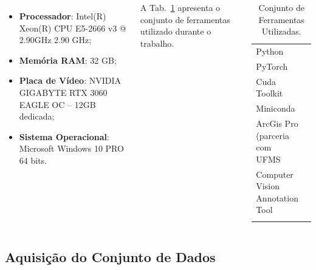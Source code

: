 \documentclass[%
  10pt,%
  aspectratio = 169,%
  compress,%
  t,%
  english,%
  brazilian,%
  tikz,
]{beamer}
\begin{document}
\begin{frame}
\begin{columns}[T]
\begin{itemize}
    \item \textbf{Processador}: Intel(R) Xeon(R) CPU E5-2666 v3 @ 2.90GHz 2.90 GHz;
    \item \textbf{Memória RAM}: 32 GB;
    \item \textbf{Placa de Vídeo}: NVIDIA GIGABYTE RTX 3060 EAGLE OC – 12GB dedicada;
    \item \textbf{Sistema Operacional}: Microsoft Windows 10 PRO 64 bits.
\end{itemize}

A Tab.~\ref{tab:tools} apresenta o conjunto de ferramentas utilizado durante o trabalho.
\begin{table}[!htb]
\centering%
\caption{Conjunto de Ferramentas Utilizadas.}%
\label{tab:tools}
\begin{tabular*}{\columnwidth}{@{\extracolsep{\fill}}ll}
\toprule
Python                                  & \cite{PythonManual}           \\
PyTorch                                 & \cite{pytorch}                \\
Cuda Toolkit                            & \cite{NvidiaCuda}                \\
Miniconda                               & \cite{Miniconda}                \\
ArcGis Pro (parceria com UFMS           & \cite{Arcgis}                \\
Computer Vision Annotation Tool         & \cite{cvat}                \\
\bottomrule
\addlinespace
\end{tabular*}
\end{table}

\end{columns}
\end{frame}

\subsection{Aquisição do Conjunto de Dados}\label{ssec:matmet4}
\end{document}
